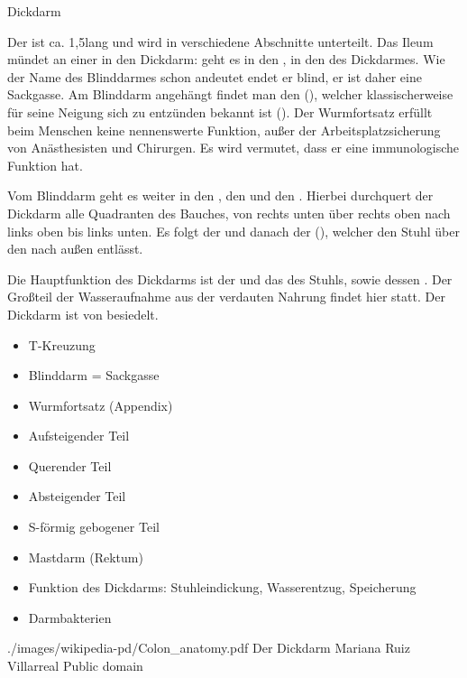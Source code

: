 \clearpage%
    
\TextSlideTeaser
{Dickdarm}%
{%
Der  
ist ca. 1,5\Meter* lang und
wird in verschiedene Abschnitte unterteilt.
% 
Das Ileum mündet an einer  in den Dickdarm: 
 geht es in den ,
 in den 
des Dickdarmes. 
%
Wie der Name des Blinddarmes schon
andeutet endet er blind, 
er ist daher eine Sackgasse. Am
Blinddarm angehängt findet man den 
(), 
welcher klassischerweise für seine Neigung sich zu entzünden bekannt ist 
(). 
%
Der Wurmfortsatz erfüllt beim
Menschen keine nennenswerte Funktion, 
außer der Arbeitsplatzsicherung von Anästhesisten und Chirurgen. 
%
Es wird vermutet, dass er
eine immunologische Funktion hat.

Vom Blinddarm geht es weiter in den 
, 
den  
und den 
. 
%
Hierbei durchquert der Dickdarm alle Quadranten des Bauches, von
rechts unten über rechts oben nach links oben bis links
unten. 
%
Es folgt der 
und danach der  (), 
welcher den Stuhl 
über den  nach außen entlässt.

Die Hauptfunktion des Dickdarms ist 
der  
und das  des Stuhls, 
sowie dessen . 
%
Der Großteil der Wasseraufnahme aus der verdauten
Nahrung findet hier statt. 
%
Der Dickdarm ist von  besiedelt.
}%
{
\begin{itemize}
  \item T-Kreuzung
  \item Blinddarm = Sackgasse
  \item Wurmfortsatz (Appendix)
  \item Aufsteigender Teil
  \item Querender Teil
  \item Absteigender Teil
  \item S-förmig gebogener Teil
  \item Mastdarm (Rektum)
  \item Funktion des Dickdarms: Stuhleindickung, Wasserentzug, Speicherung
  \item Darmbakterien
\end{itemize}}%
{./images/wikipedia-pd/Colon_anatomy.pdf}%
{Der Dickdarm}%
{}%
{Mariana Ruiz Villarreal}%
{Public domain}%
 
